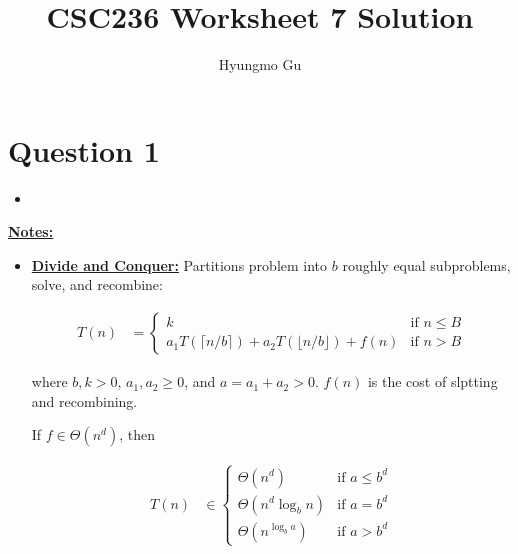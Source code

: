 \documentclass[12pt]{article}
\begin{document}
\title{CSC236 Worksheet 7 Solution}
\author{Hyungmo Gu}
\maketitle

\section*{Question 1}
\begin{itemize}
    \item

\end{itemize}

\bigskip

\underline{\textbf{Notes:}}

\bigskip

\begin{itemize}
    \item

    \underline{\textbf{Divide and Conquer:}} Partitions problem into $b$ roughly
    equal subproblems, solve, and recombine:

    \bigskip

    \begin{align}
        T(n) &= \begin{cases}
        k & \text{if $n \leq B$}\\
        a_1T(\lceil n/b \rceil) + a_2T(\lfloor n/b \rfloor) + f(n) & \text{if $n > B$}
        \end{cases}
    \end{align}

    \bigskip

    where $b,k > 0$, $a_1,a_2 \geq 0$, and $a = a_1 + a_2 > 0$. $f(n)$ is the
    cost of slptting and recombining.

    \bigskip

    If $f \in \Theta(n^d)$, then

    \begin{align}
        T(n) &\in \begin{cases}
        \Theta(n^d) & \text{if $a \leq b^d$}\\
        \Theta(n^d\log_b n) & \text{if $a = b^d$}\\
        \Theta(n^{\log_b a}) & \text{if $a > b^d$}
        \end{cases}
    \end{align}
\end{itemize}
\end{document}
